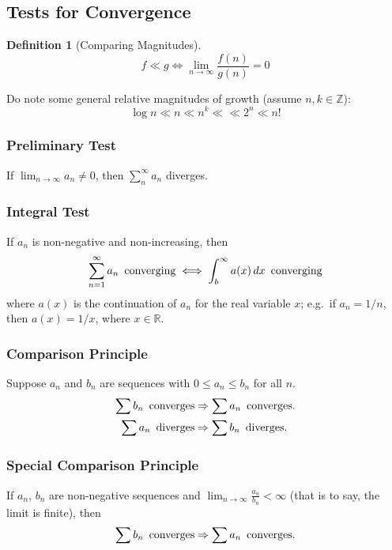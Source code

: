\documentclass[10pt]{scrartcl}
\numberwithin{equation}{subsection}
\theoremstyle{definition}
\newtheorem{definition}{Definition}[section]
\theoremstyle{remark}
\newenvironment{definitionSR}
	{
		\begin{siderules}
			\begin{definition}
			}
			{
			\end{definition}
		\end{siderules}
	}
\newcommand{\Integers}{\mathbb{Z}}
\begin{document}
\subsection{Tests for Convergence}

\begin{definitionSR}[Comparing Magnitudes]
	\[
		f \ll g \iff \lim_{n \to \infty } \frac{f(n)}{g(n)} = 0
	\]
\end{definitionSR}

Do note some general relative magnitudes of growth (assume $n, k \in \Integers$):
\begin{equation}
	\log n \ll n \ll n^k \ll \ll 2^n \ll n!
\end{equation}

\subsubsection{Preliminary Test}
If $\lim_{n \to \infty} a_n \neq 0$, then $\sum_n^\infty a_n$ diverges.

\subsubsection{Integral Test}
If $a_n$ is non-negative and non-increasing, then
\[
	\sum_{n=1}^\infty a_n \text{\, converging} \iff \int_b^\infty a(x)\,dx \text{\, converging}
\]
where $a(x)$ is the continuation of $a_n$ for the real variable $x$; e.g.\ if $a_n = 1/n$, then $a(x) = 1/x$, where $x \in \mathbb{R}$.
\subsubsection{Comparison Principle}
Suppose $a_n$ and $b_n$ are sequences with $0 \leq a_n \leq b_n$ for all $n$.
\begin{align*}
\sum b_n \text{\, converges}  &\Rightarrow \sum a_n \text{\, converges.} \\
\sum a_n \text{\, diverges}  &\Rightarrow \sum b_n \text{\, diverges.}
\end{align*}

\subsubsection{Special Comparison Principle}
If $a_n$, $b_n$ are non-negative sequences and $\lim_{n \to \infty} \frac{a_n}{b_n} < \infty$ (that is to say, the limit is finite), then
\[
\sum b_n \text{\, converges}  \Rightarrow \sum a_n \text{\, converges.} 
\]
\end{document}

